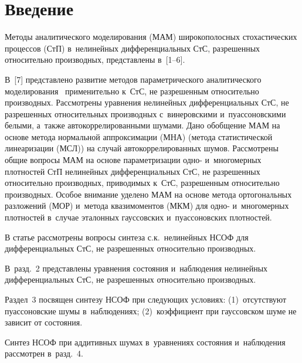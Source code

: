 

\thispagestyle{headings}

\begin{multicols}{2}

\label{st\stat}



\section{Введение}

\vspace*{-3pt}

Методы  аналитического моделирования (МАМ) широкополосных стохастических процессов 
(СтП) в~нелинейных дифференциальных СтС, разрешенных относительно производных, представлены в~[1--6].

В~[7] представлено развитие методов па\-ра\-мет\-ри\-че\-ско\-го аналитического моделирования~\cite{1-s, 2-s, 5-s} 
применительно к~СтС, не разрешенным относительно производных.
Рассмотрены уравнения нелинейных дифференциальных СтС, не разрешенных 
относительных производных с~винеровскими и~пуассоновскими белыми, а~также автокоррелированными шумами.
 Дано обобщение МАМ  на основе метода нормальной аппроксимации (МНА)
  (метода статистической линеаризации (МСЛ)) на случай автокоррелированных шумов. 
 Рассмотрены общие вопросы МАМ на основе параметризации одно- и~многомерных плотностей СтП нелинейных 
 дифференциальных  СтС, не разрешенных относительно производных, приводимых к~СтС, 
 разрешенным относительно производных. Особое внимание уделено МАМ на основе метода 
 ортогональных разложений (МОР) и~метода квазимоментов (МКМ) для одно- и~многомерных плотностей в~случае 
 эталонных гауссовских и~пуассоновских плотностей.

В статье рассмотрены вопросы синтеза с.к.\ нелинейных НСОФ 
для дифференциальных СтС, не разрешенных относительно 
производных. 

В~разд.~2 представлены уравнения состояния и~наблюдения нелинейных дифференциальных 
СтС, не разрешенных относительно производных. 

Раздел~3 посвящен синтезу НСОФ при сле\-ду\-ющих условиях: 
(1)~отсутствуют пуассоновские шумы в~наблюдениях; (2)~коэффициент при гауссовском шуме не зависит от состояния. 

Синтез НСОФ при аддитивных шумах в~уравнениях состояния и~наблюдения рассмотрен в~разд.~4. 


\end{multicols}
